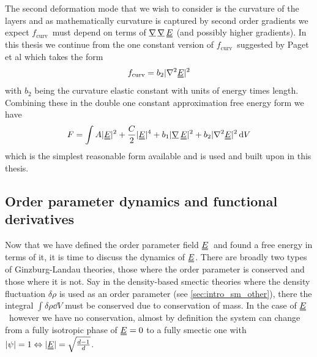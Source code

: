 \documentclass[12pt]{article}
\newcommand{\suf}[2]{\stackunder[0.5pt]{\stackunder[1pt]{\ensuremath{#1}}{\rule{\widthof{\ensuremath{#2}}*\real{0.9}}{.1ex}}}{}}
\newcommand{\duf}[2]{\stackunder[0.5pt]{\stackunder[0.8pt]{\stackunder[1pt]{\ensuremath{#1}}{\rule{\widthof{\ensuremath{#2}}*\real{0.9}}{.1ex}}}{\rule{\widthof{\ensuremath{#2}}*\real{0.9}}{.1ex}}}{}}
\newcommand{\du}[1]{\duf{#1}{#1}}
\newcommand{\mgrad}{\ensuremath{\suf{\nabla}{K}\,}}
\newcommand{\EE}{\ensuremath{\du{E}}}
\newcommand{\FU}{\ensuremath{f_\text{curv}}}
\begin{document}
        The second deformation mode that we wish to consider is the curvature of the layers and as mathematically curvature is captured by second order gradients we expect \FU\ must depend on terms of $\mgrad\mgrad\EE$ (and possibly higher gradients).
        In this thesis we continue from the one constant version of \FU\ suggested by Paget et al which takes the form
        \begin{equation}
            \FU = b_2 |\nabla^2 \EE|^2
        \end{equation}
        with $b_2$ being the curvature elastic constant with units of energy times length.
        Combining these in the double one constant approximation free energy form we have
        \begin{equation}\label{eq:Foca}
            F = \int A |\du{E}|^2 + \frac{C}{2}|\du{E}|^4 + b_1 |\mgrad \EE|^2 + b_2 |\nabla^2 \EE|^2 \dd{V}
        \end{equation}
        which is the simplest reasonable form available and is used and built upon in this thesis.

    \subsection{Order parameter dynamics and functional derivatives}\label{sec:Ei_fdv}
        Now that we have defined the order parameter field \EE\ and found a free energy in terms of it, it is time to discuss the dynamics of \EE.
        There are broadly two types of Ginzburg-Landau theories, those where the order parameter is conserved and those where it is not.
        Say in the density-based smectic theories where the density fluctuation $\delta\rho$ is used as an order parameter (see \cref{sec:intro_sm_other}), there the integral $\int \delta\rho \dd{V}$ must be conserved due to conservation of mass.
        In the case of \EE\ however we have no conservation, almost by definition the system can change from a fully isotropic phase of $\EE=0$ to a fully smectic one with $|\psi|=1 \Leftrightarrow |\EE| = \sqrt{\frac{d-1}{d}}$.
\end{document}
